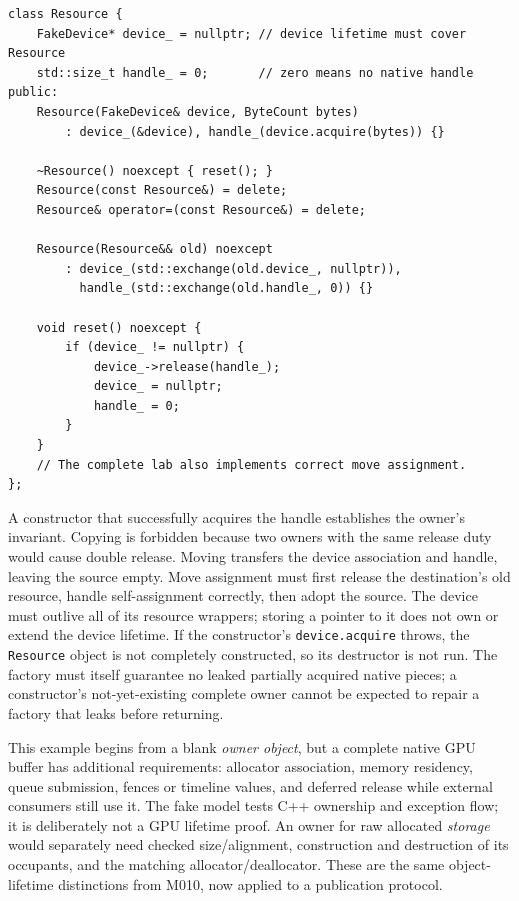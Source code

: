 \begin{verbatim}
class Resource {
    FakeDevice* device_ = nullptr; // device lifetime must cover Resource
    std::size_t handle_ = 0;       // zero means no native handle
public:
    Resource(FakeDevice& device, ByteCount bytes)
        : device_(&device), handle_(device.acquire(bytes)) {}

    ~Resource() noexcept { reset(); }
    Resource(const Resource&) = delete;
    Resource& operator=(const Resource&) = delete;

    Resource(Resource&& old) noexcept
        : device_(std::exchange(old.device_, nullptr)),
          handle_(std::exchange(old.handle_, 0)) {}

    void reset() noexcept {
        if (device_ != nullptr) {
            device_->release(handle_);
            device_ = nullptr;
            handle_ = 0;
        }
    }
    // The complete lab also implements correct move assignment.
};
\end{verbatim}

A constructor that successfully acquires the handle establishes the owner's invariant. Copying is forbidden because two owners with the same release duty would cause double release. Moving transfers the device association and handle, leaving the source empty. Move assignment must first release the destination's old resource, handle self-assignment correctly, then adopt the source. The device must outlive all of its resource wrappers; storing a pointer to it does not own or extend the device lifetime. If the constructor's \texttt{device.acquire} throws, the \texttt{Resource} object is not completely constructed, so its destructor is not run. The factory must itself guarantee no leaked partially acquired native pieces; a constructor's not-yet-existing complete owner cannot be expected to repair a factory that leaks before returning.

This example begins from a blank \emph{owner object}, but a complete native GPU buffer has additional requirements: allocator association, memory residency, queue submission, fences or timeline values, and deferred release while external consumers still use it. The fake model tests C++ ownership and exception flow; it is deliberately not a GPU lifetime proof. An owner for raw allocated \emph{storage} would separately need checked size/alignment, construction and destruction of its occupants, and the matching allocator/deallocator. These are the same object-lifetime distinctions from M010, now applied to a publication protocol.

